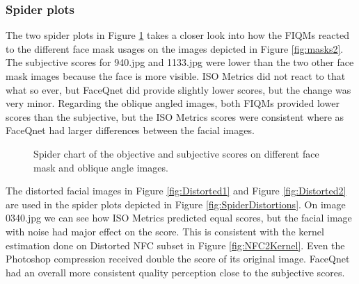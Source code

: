 \subsubsection{Spider plots}

The two spider plots in Figure \ref{fig:SpiderMaskTilted} takes a closer look into how the FIQMs reacted to the different face mask usages on the images depicted in Figure \ref{fig:masks2}. The subjective scores for 940.jpg and 1133.jpg were lower than the two other face mask images because the face is more visible. ISO Metrics did not react to that what so ever, but FaceQnet did provide slightly lower scores, but the change was very minor. Regarding the oblique angled images, both FIQMs provided lower scores than the subjective, but the ISO Metrics scores were consistent where as FaceQnet had larger differences between the facial images.

\begin{figure}[h]
\centering
    \caption{Spider chart of the objective and subjective scores on different face mask and oblique angle images.}
    \label{fig:SpiderMaskTilted}
\end{figure}

The distorted facial images in Figure \ref{fig:Distorted1} and Figure \ref{fig:Distorted2} are used in the spider plots depicted in Figure \ref{fig:SpiderDistortions}. On image 0340.jpg we can see how ISO Metrics predicted equal scores, but the facial image with noise had major effect on the score. This is consistent with the kernel estimation done on Distorted NFC subset in Figure \ref{fig:NFC2Kernel}. Even the Photoshop compression received double the score of its original image. FaceQnet had an overall more consistent quality perception close to the subjective scores.  

